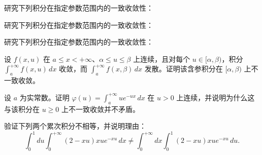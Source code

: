 \noindent\begin{minipage}{\textwidth}
研究下列积分在指定参数范围内的一致收敛性：
\end{minipage}\par\vfill
\noindent\begin{minipage}{\textwidth}
研究下列积分在指定参数范围内的一致收敛性：
\end{minipage}\par\vfill
\noindent\begin{minipage}{\textwidth}
研究下列积分在指定参数范围内的一致收敛性：
\end{minipage}\par\vfill
\newpage
\noindent\begin{minipage}{\textwidth}
设 $f(x,u)$ 在 $a\le x<+\infty$、$\alpha\le u\le\beta$ 上连续，且对每个 $u\in[\alpha,\beta)$，积分 $\displaystyle\int_a^{+\infty}f(x,u)\,dx$ 收敛，而 $\displaystyle\int_a^{+\infty}f(x,\beta)\,dx$ 发散。证明该含参积分在 $[\alpha,\beta)$ 上不一致收敛。
\end{minipage}\par\vfill
\noindent\begin{minipage}{\textwidth}
设 $a$ 为实常数。证明 $\displaystyle\varphi(u)=\int_a^{+\infty}ue^{-ux}\,dx$ 在 $u>0$ 上连续，并说明为什么这与该积分在 $u\ge0$ 上不一致收敛并不矛盾。
\end{minipage}\par\vfill
\noindent\begin{minipage}{\textwidth}
验证下列两个累次积分不相等，并说明理由：\[\int_0^1du\int_0^{+\infty}(2-xu)xu e^{-xu}\,dx\ne\int_0^{+\infty}dx\int_0^1(2-xu)xu e^{-xu}\,du.\]
\end{minipage}\par\vfill
